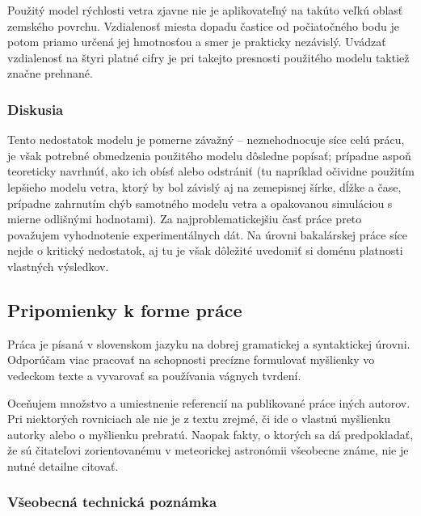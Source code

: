 Použitý model rýchlosti vetra zjavne nie je aplikovateľný na takúto
veľkú oblasť zemského povrchu. Vzdialenosť miesta dopadu častice od
počiatočného bodu je potom priamo určená jej hmotnosťou a smer je
prakticky nezávislý. Uvádzať vzdialenosť na štyri platné cifry je pri
takejto presnosti použitého modelu taktiež značne prehnané.

\hypertarget{diskusia}{%
\subsubsection{Diskusia}\label{diskusia}}

Tento nedostatok modelu je pomerne závažný -- neznehodnocuje síce celú
prácu, je však potrebné obmedzenia použitého modelu dôsledne popísať;
prípadne aspoň teoreticky navrhnúť, ako ich obísť alebo odstrániť (tu
napríklad očividne použitím lepšieho modelu vetra, ktorý by bol závislý
aj na zemepisnej šírke, dĺžke a čase, prípadne zahrnutím chýb samotného
modelu vetra a opakovanou simuláciou s mierne odlišnými hodnotami). Za
najproblematickejšiu časť práce preto považujem vyhodnotenie
experimentálnych dát. Na úrovni bakalárskej práce síce nejde o kritický
nedostatok, aj tu je však dôležité uvedomiť si doménu platnosti
vlastných výsledkov.

\hypertarget{pripomienky-k-forme-pruxe1ce}{%
\subsection{Pripomienky k forme
práce}\label{pripomienky-k-forme-pruxe1ce}}

Práca je písaná v slovenskom jazyku na dobrej gramatickej a syntaktickej
úrovni. Odporúčam viac pracovať na schopnosti precízne formulovať
myšlienky vo vedeckom texte a vyvarovať sa používania vágnych tvrdení.

Oceňujem množstvo a umiestnenie referencií na publikované práce iných
autorov. Pri niektorých rovniciach ale nie je z textu zrejmé, či ide o
vlastnú myšlienku autorky alebo o myšlienku prebratú. Naopak fakty, o
ktorých sa dá predpokladať, že sú čitateľovi zorientovanému v
meteorickej astronómii všeobecne známe, nie je nutné detailne citovať.

\hypertarget{vux161eobecnuxe1-technickuxe1-poznuxe1mka}{%
\subsubsection{Všeobecná technická
poznámka}\label{vux161eobecnuxe1-technickuxe1-poznuxe1mka}}


